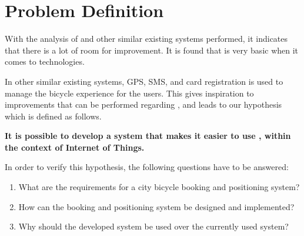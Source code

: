 \section{Problem Definition}
With the analysis of \bycykel and other similar existing systems performed, it indicates that there is a lot of room for improvement.
It is found that \bycykel is very basic when it comes to technologies.

In other similar existing systems, GPS, SMS, and card registration is used to manage the bicycle experience for the users.
This gives inspiration to improvements that can be performed regarding \bycykelwithoutspace, and leads to our hypothesis which is defined as follows.

\begin{center}
\textbf{It is possible to develop a system that makes it easier to use \bycykelwithoutspace, within the context of Internet of Things.}
\end{center}

In order to verify this hypothesis, the following questions have to be answered:

\begin{enumerate}
	\item What are the requirements for a city bicycle booking and positioning system?
	\item How can the booking and positioning system be designed and implemented?
	\item Why should the developed system be used over the currently used system?
\end{enumerate}